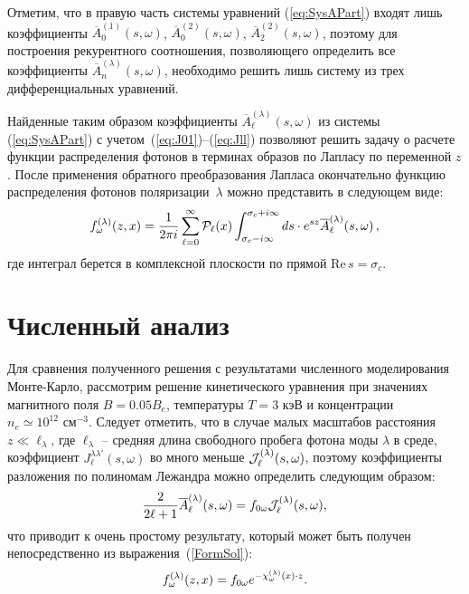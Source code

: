 \documentclass[14pt, russian]{article}
\begin{document}
Отметим, что в правую часть системы уравнений (\ref{eq:SysAPart}) входят лишь   коэффициенты $\overline{A}_0^{(1)}(s,\omega)$, $\overline{A}_0^{(2)}(s,\omega)$, $\overline{A}_2^{(2)}(s,\omega)$, поэтому для построения рекурентного соотношения, позволяющего определить все коэффициенты $\overline{A}_n^{(\lambda)}(s,\omega)$, необходимо решить лишь систему из трех дифференциальных уравнений. 

Найденные таким образом коэффициенты $\overline{A}_\ell^{(\lambda)}(s,\omega)$  из системы (\ref{eq:SysAPart}) с учетом~(\ref{eq:J01})--(\ref{eq:Jll})
 позволяют  решить задачу о расчете функции распределения фотонов в терминах образов по Лапласу по переменной $z$. После применения обратного преобразования Лапласа окончательно функцию распределения фотонов поляризации~$\lambda$ можно представить в следующем виде:
\begin{equation}\label{eq:SolveFunc}
f_\omega^{(\lambda)}(z, x) = \frac{1}{2\pi i}\sum_{\ell=0}^{\infty} 
{\cal P}_\ell(x)\int_{\sigma_c-i\infty}^{\sigma_c + i \infty}ds \cdot e^{sz} \overline{A}^{(\lambda)}_\ell(s,\omega)\, ,
\end{equation}
где интеграл берется в комплексной плоскости по прямой $\text{Re} \, s = \sigma_c$.
\section{Численный анализ}

Для сравнения полученного решения с результатами численного моделирования Монте-Карло, рассмотрим решение кинетического уравнения при значениях магнитного поля $B=0.05 B_e$, температуры $T=3$ кэВ и концентрации $n_e\simeq 10^{12} \text{ см}^{-3}$.
Следует отметить, что в случае малых масштабов расстояния~$z\ll \ell_\lambda$, где $\ell_\lambda$ -- средняя длина свободного пробега  фотона моды $\lambda$ в среде,  коэффициент $J_\ell^{\lambda\lambda'}(s,\omega)$ во много меньше ${\cal J}_\ell^{(\lambda)}(s,\omega)$, поэтому коэффициенты разложения по полиномам Лежандра можно определить следующим образом:
\begin{equation}
	\frac{2}{2 \ell +1} \overline{A}_\ell^{(\lambda)}(s,\omega)= f_{0\omega} {\cal J}_\ell^{(\lambda)}(s,\omega),
\end{equation}
что приводит к очень простому результату, который может быть получен непосредственно из выражения~(\ref{FormSol}):
\begin{equation}\label{FormSolZeroL}
	f_\omega^{(\lambda)}(z,x)=f_{0\omega} 	e^{-{\cal \chi}_\omega^{(\lambda)}(x)\cdot z}.
\end{equation}
\end{document}
